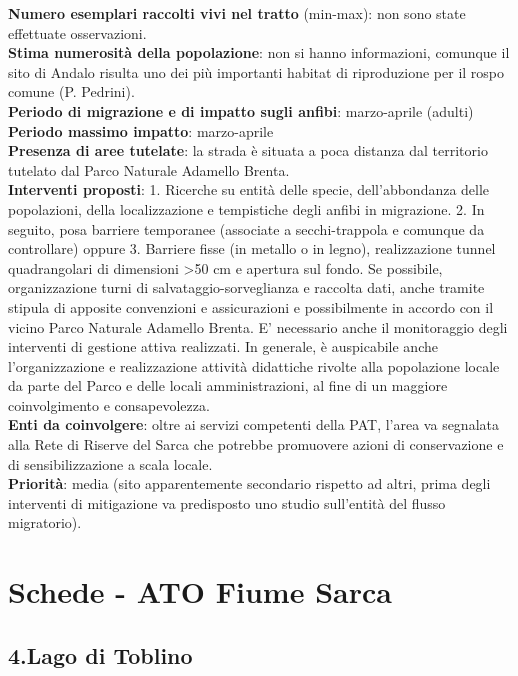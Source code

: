\documentclass[11pt,a4paper,twoside]{memoir}
\begin{document}
\textbf{Numero esemplari raccolti vivi nel tratto} (min-max): non sono state effettuate osservazioni. \\
\textbf{Stima numerosità della popolazione}: non si hanno informazioni, comunque il sito di Andalo risulta uno dei più importanti habitat di riproduzione per il rospo comune (P. Pedrini).  \\
\textbf{Periodo di migrazione e di impatto sugli anfibi}: marzo-aprile (adulti) \\
\textbf{Periodo massimo impatto}: marzo-aprile \\
\textbf{Presenza di aree tutelate}: la strada è situata a poca distanza dal territorio tutelato dal Parco Naturale Adamello Brenta. \\
\textbf{Interventi proposti}: 1. Ricerche su entità delle specie, dell'abbondanza delle popolazioni, della localizzazione e tempistiche degli anfibi in migrazione. 2. In seguito, posa barriere temporanee (associate a secchi-trappola e comunque da controllare) oppure 3. Barriere fisse (in metallo o in legno), realizzazione tunnel quadrangolari di dimensioni >50 cm e apertura sul fondo. Se possibile, organizzazione turni di salvataggio-sorveglianza e raccolta dati, anche tramite stipula di apposite convenzioni e assicurazioni e possibilmente in accordo con il vicino Parco Naturale Adamello Brenta. E' necessario anche il monitoraggio degli interventi di gestione attiva realizzati. In generale, è auspicabile anche l'organizzazione e realizzazione attività didattiche rivolte alla popolazione locale da parte del Parco e delle locali amministrazioni, al fine di un maggiore coinvolgimento e consapevolezza. \\
\textbf{Enti da coinvolgere}: oltre ai servizi competenti della PAT, l’area va segnalata alla Rete di Riserve del Sarca che potrebbe promuovere azioni di conservazione e di sensibilizzazione a scala locale. \\
\textbf{Priorità}: media (sito apparentemente secondario rispetto ad altri, prima degli interventi di mitigazione va predisposto uno studio sull'entità del flusso migratorio).

\newpage
\section{Schede - ATO Fiume Sarca}
\begin{tcolorbox}[breakable,colback=white,colframe=green,width=10cm]
\subsection{4.Lago di Toblino}
\end{tcolorbox}
\end{document}
